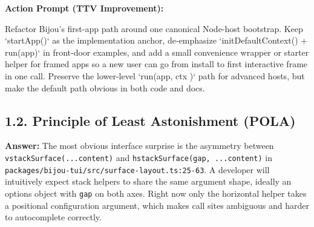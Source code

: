 \textbf{Action Prompt (TTV Improvement):}

\begin{CodeBlock}
Refactor Bijou's first-app path around one canonical Node-host bootstrap. Keep `startApp()` as the implementation anchor, de-emphasize `initDefaultContext() + run(app)` in front-door examples, and add a small convenience wrapper or starter helper for framed apps so a new user can go from install to first interactive frame in one call. Preserve the lower-level `run(app, { ctx })` path for advanced hosts, but make the default path obvious in both code and docs.
\end{CodeBlock}

\subsection{1.2. Principle of Least Astonishment (POLA)}\label{record-416-principle-of-least-astonishment-pola}

\textbf{Answer:} The most obvious interface surprise is the asymmetry between \texttt{v\allowbreak{}s\allowbreak{}t\allowbreak{}a\allowbreak{}c\allowbreak{}k\allowbreak{}S\allowbreak{}u\allowbreak{}r\allowbreak{}f\allowbreak{}a\allowbreak{}c\allowbreak{}e\allowbreak{}(\allowbreak{}.\allowbreak{}.\allowbreak{}.\allowbreak{}c\allowbreak{}o\allowbreak{}n\allowbreak{}t\allowbreak{}e\allowbreak{}n\allowbreak{}t\allowbreak{})} and \texttt{h\allowbreak{}s\allowbreak{}t\allowbreak{}a\allowbreak{}c\allowbreak{}k\allowbreak{}S\allowbreak{}u\allowbreak{}r\allowbreak{}f\allowbreak{}a\allowbreak{}c\allowbreak{}e\allowbreak{}(\allowbreak{}g\allowbreak{}a\allowbreak{}p\allowbreak{},\allowbreak{} \allowbreak{}.\allowbreak{}.\allowbreak{}.\allowbreak{}c\allowbreak{}o\allowbreak{}n\allowbreak{}t\allowbreak{}e\allowbreak{}n\allowbreak{}t\allowbreak{})} in \texttt{p\allowbreak{}a\allowbreak{}c\allowbreak{}k\allowbreak{}a\allowbreak{}g\allowbreak{}e\allowbreak{}s\allowbreak{}/\allowbreak{}b\allowbreak{}i\allowbreak{}j\allowbreak{}o\allowbreak{}u\allowbreak{}-\allowbreak{}t\allowbreak{}u\allowbreak{}i\allowbreak{}/\allowbreak{}s\allowbreak{}r\allowbreak{}c\allowbreak{}/\allowbreak{}s\allowbreak{}u\allowbreak{}r\allowbreak{}f\allowbreak{}a\allowbreak{}c\allowbreak{}e\allowbreak{}-\allowbreak{}l\allowbreak{}a\allowbreak{}y\allowbreak{}o\allowbreak{}u\allowbreak{}t\allowbreak{}.\allowbreak{}t\allowbreak{}s\allowbreak{}:\allowbreak{}2\allowbreak{}5\allowbreak{}-\allowbreak{}6\allowbreak{}3}. A developer will intuitively expect stack helpers to share the same argument shape, ideally an options object with \texttt{g\allowbreak{}a\allowbreak{}p} on both axes. Right now only the horizontal helper takes a positional configuration argument, which makes call sites ambiguous and harder to autocomplete correctly.

